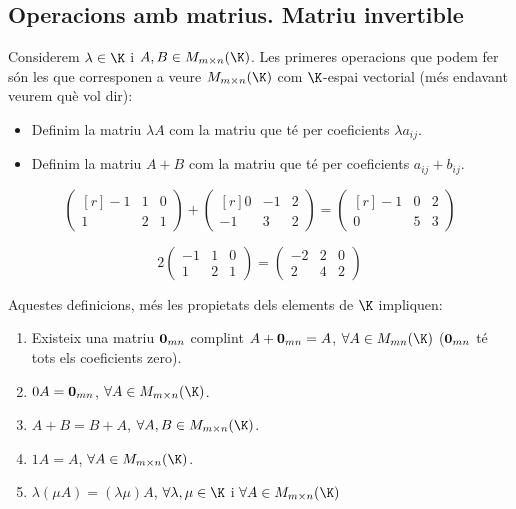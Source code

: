 \subsection{Operacions amb matrius. Matriu invertible}\label{subsec:opmat}
Considerem $\lambda \in \K$ i $A,B \in M_{m\times n}(\K)$. Les primeres operacions que podem fer són les que corresponen a veure $M_{m\times n} (\K)$ com $\K$-espai vectorial (més endavant veurem què vol dir):
\begin{itemize}
	\item Definim la matriu $\lambda A$ com la matriu que té per coeficients $\lambda a_{ij}$.
	\item Definim la matriu $A+B$ com la matriu que té per coeficients $a_{ij}+b_{ij}$.
\end{itemize}
\begin{exemple}
	\[
	\begin{pmatrix*}[r] -1 & 1 & 0 \\ 1 & 2 & 1 \end{pmatrix*} +
	\begin{pmatrix*}[r] 0 & -1 & 2 \\ -1 & 3 & 2 \end{pmatrix*} =
	\begin{pmatrix*}[r] -1 & 0 & 2 \\ 0 & 5 & 3 \end{pmatrix*}
	\]
\end{exemple}
\begin{exemple}
	$$
	2 \begin{pmatrix} -1 & 1 & 0 \\ 1 & 2 & 1 \end{pmatrix} =
	\begin{pmatrix} -2 & 2 & 0 \\ 2 & 4 & 2 \end{pmatrix} 
	$$
\end{exemple}
Aquestes definicions, més les propietats dels elements de $\K$ impliquen:
\begin{enumerate}
	\item Existeix una matriu $\mathbf{0}_{mn}$ complint $A+\mathbf{0}_{mn}=A$, $\forall A \in M_{mn}(\K)$ ($\mathbf{0}_{mn}$ té tots els coeficients zero).
	\item $0 A = \mathbf{0}_{mn}$, $\forall A \in M_{m\times n}(\K)$.
	\item $A+B=B+A$, $\forall A,B \in M_{m\times n}(\K)$.
	\item $1A=A$, $\forall A \in M_{m\times n}(\K)$.
	\item $\lambda (\mu A)= (\lambda \mu) A$, $\forall \lambda,\mu \in \K$ i $\forall A \in M_{m\times n}(\K)$
\end{enumerate}

